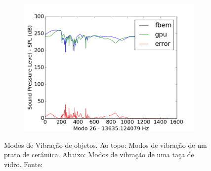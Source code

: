 \begin{figure}[ht]
\begin{subfigure}{0.5\textwidth}
	\includegraphics[width=\textwidth]{../data/transfer_test/ceramic_mug/plots/ceramic_mug-tfv-0_26.png}
	\label{fig:coef_mug_26}
\end{subfigure}
\caption[Modos de Vibração de objetos]{Modos de Vibração de objetos. Ao topo: Modos de vibração de um prato de cerâmica. Abaixo: Modos de vibração de uma taça de vidro. Fonte: \cite{langlois2014eigenmode}}
\label{fig:coef_mug}
\end{figure}

